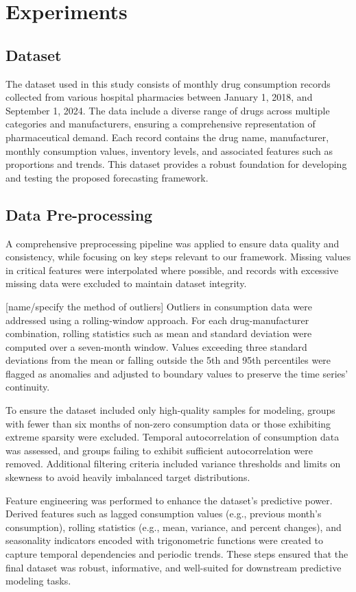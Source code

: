 \documentclass[journal]{IEEEtran}
\begin{document}
\section{Experiments}

\subsection{Dataset}
The dataset used in this study consists of monthly drug consumption records collected from various hospital pharmacies between January 1, 2018, and September 1, 2024. The data include a diverse range of drugs across multiple categories and manufacturers, ensuring a comprehensive representation of pharmaceutical demand. Each record contains the drug name, manufacturer, monthly consumption values, inventory levels, and associated features such as proportions and trends. This dataset provides a robust foundation for developing and testing the proposed forecasting framework.

\subsection{Data Pre-processing}
A comprehensive preprocessing pipeline was applied to ensure data quality and consistency, while focusing on key steps relevant to our framework. Missing values in critical features were interpolated where possible, and records with excessive missing data were excluded to maintain dataset integrity.

[name/specify the method of outliers] Outliers in consumption data were addressed using a rolling-window approach. For each drug-manufacturer combination, rolling statistics such as mean and standard deviation were computed over a seven-month window. Values exceeding three standard deviations from the mean or falling outside the 5th and 95th percentiles were flagged as anomalies and adjusted to boundary values to preserve the time series' continuity.

To ensure the dataset included only high-quality samples for modeling, groups with fewer than six months of non-zero consumption data or those exhibiting extreme sparsity were excluded. Temporal autocorrelation of consumption data was assessed, and groups failing to exhibit sufficient autocorrelation were removed. Additional filtering criteria included variance thresholds and limits on skewness to avoid heavily imbalanced target distributions.

Feature engineering was performed to enhance the dataset's predictive power. Derived features such as lagged consumption values (e.g., previous month’s consumption), rolling statistics (e.g., mean, variance, and percent changes), and seasonality indicators encoded with trigonometric functions were created to capture temporal dependencies and periodic trends. These steps ensured that the final dataset was robust, informative, and well-suited for downstream predictive modeling tasks.
\end{document}
